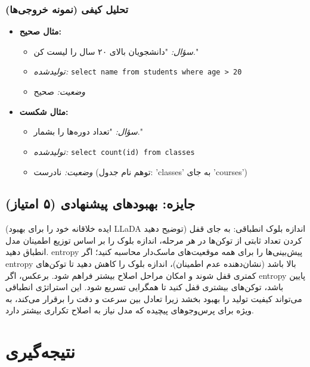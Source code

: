 \documentclass[12pt,a4paper]{article}
\theoremstyle{definition}
\begin{document}
\subsubsection*{تحلیل کیفی (نمونه خروجی‌ها)}
\begin{itemize}
    \item \textbf{مثال صحیح:}
    \begin{itemize}
        \item \textit{سؤال:} "دانشجویان بالای ۲۰ سال را لیست کن."
        \item \textit{تولیدشده:} \texttt{select name from students where age > 20}
        \item \textit{وضعیت:} صحیح
    \end{itemize}
    \item \textbf{مثال شکست:}
    \begin{itemize}
        \item \textit{سؤال:} "تعداد دوره‌ها را بشمار."
        \item \textit{تولیدشده:} \texttt{select count(id) from classes}
        \item \textit{وضعیت:} نادرست (توهم نام جدول: 'classes' به جای 'courses')
    \end{itemize}
\end{itemize}

\subsection{جایزه: بهبودهای پیشنهادی (۵ امتیاز)}
(ایده خلاقانه خود را برای بهبود LLaDA توضیح دهید)
اندازه بلوک انطباقی: به جای قفل کردن تعداد ثابتی از توکن‌ها در هر مرحله، اندازه بلوک را بر اساس توزیع اطمینان مدل انطباق دهید. entropy پیش‌بینی‌ها را برای همه موقعیت‌های ماسک‌دار محاسبه کنید؛ اگر entropy بالا باشد (نشان‌دهنده عدم اطمینان)، اندازه بلوک را کاهش دهید تا توکن‌های کمتری قفل شوند و امکان مراحل اصلاح بیشتر فراهم شود. برعکس، اگر entropy پایین باشد، توکن‌های بیشتری قفل کنید تا همگرایی تسریع شود. این استراتژی انطباقی می‌تواند کیفیت تولید را بهبود بخشد زیرا تعادل بین سرعت و دقت را برقرار می‌کند، به ویژه برای پرس‌وجوهای پیچیده که مدل نیاز به اصلاح تکراری بیشتر دارد.

\section{نتیجه‌گیری}
\end{document}
